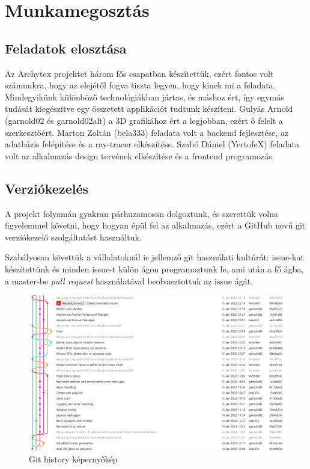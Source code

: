 \section{Munkamegosztás}

\subsection{Feladatok elosztása}
Az Archytex projektet három fős csapatban készítettük, ezért fontos volt számunkra, hogy az elejétől fogva tiszta legyen, hogy kinek mi a feladata. Mindegyikünk különböző technológiákban jártas, és máshoz ért, így egymás tudását kiegészítve egy összetett applikációt tudtunk készíteni. Gulyás Arnold (garnold02 és garnold02alt) a 3D grafikához ért a legjobban, ezért ő felelt a szerkesztőért. Marton Zoltán (bela333) feladata volt a backend fejlesztése, az adatbázis felépítése és a ray-tracer elkészítése. Szabó Dániel (YertofeX) feladata volt az alkalmazás design tervének elkészítése és a frontend programozás.

\subsection{Verziókezelés}
A projekt folyamán gyakran párhuzamosan dolgoztunk, és szerettük volna figyelemmel követni, hogy hogyan épül fel az alkalmazás, ezért a GitHub nevű git verziókezelő szolgáltatást használtuk.

Szabályosan követtük a vállalatoknál is jellemző git használati kultúrát: issue-kat készítettünk és minden issue-t külön ágon programoztunk le, ami után a fő ágba, a master-be \emph{pull request} használatával beolvasztottuk az issue ágát.

\begin{figure}[H]
  \centering
  \includegraphics[width=.9\textwidth]{parts/developer-documentation/work/images/git-history.png}
  \caption{Git history képernyőkép}
\end{figure}

